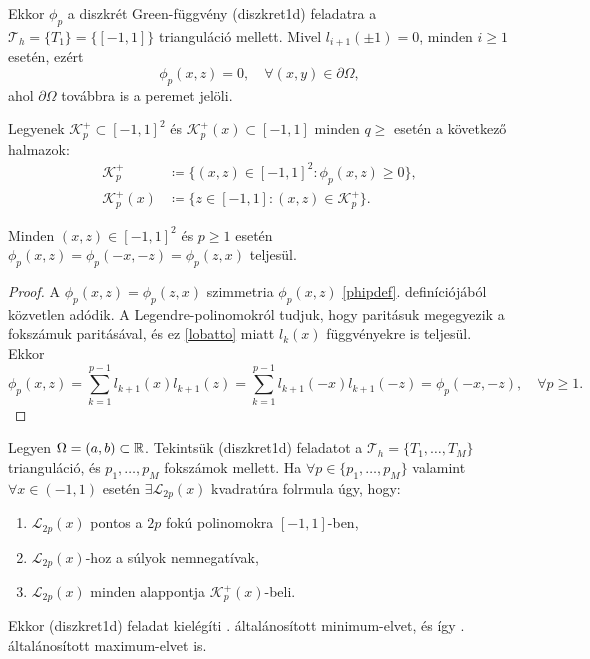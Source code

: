 Ekkor $\phi_p$ a diszkrét Green-függvény \aref({diszkret1d}) feladatra a $\mathcal{T}_h = \{T_1\} = \{[-1,1]\}$ trianguláció mellett. Mivel $l_{i+1}(\pm 1) = 0$, minden $i \geq 1$ esetén, ezért 
	\begin{equation}
		\phi_p(x,z) = 0, \quad \forall (x,y) \in \partial \Omega,
	\end{equation}
	ahol $\partial \Omega$ továbbra is a peremet jelöli.
	
\begin{definition}
	Legyenek $\mathcal{K}_p^+ \subset [-1,1]^2$ és $\mathcal{K}_p^+(x) \subset [-1,1]$ minden $q \geq$ esetén a következő halmazok:
	\begin{align*}
		\mathcal{K}_p^+ &\coloneqq  \{ (x,z) \in [-1,1]^2 : \phi_p(x,z) \geq 0 \}, \\
		\mathcal{K}_p^+(x) &\coloneqq  \{ z \in [-1,1] : (x,z) \in  \mathcal{K}_p^+ \}.	
	\end{align*}	
\end{definition}

\begin{lemma}\label{szimmlemma}
	Minden $(x,z) \in [-1,1]^2$ és $p\geq 1$ esetén $\phi_p(x,z) = \phi_p(-x,-z) = \phi_p(z,x)$ teljesül.
\end{lemma}

\begin{proof}
	A $\phi_p(x,z) = \phi_p(z,x)$ szimmetria $\phi_p(x,z)$ \eqref{phipdef}. definíciójából  közvetlen adódik. A Legendre-polinomokról tudjuk, hogy paritásuk megegyezik a fokszámuk paritásával, és ez \eqref{lobatto} miatt $l_k(x)$ függvényekre is teljesül. Ekkor	
	\begin{equation*}
		\phi_p(x,z) = \sum_{k=1}^{p-1} l_{k+1}(x)l_{k+1}(z) = \sum_{k=1}^{p-1} l_{k+1}(-x)l_{k+1}(-z) = \phi_p(-x,-z), \quad \forall p \geq 1.
	\end{equation*}	
\end{proof}

\begin{theorem}\label{fottetel}
	Legyen $\Omega = (a,b) \subset \mathbb{R}$. Tekintsük \aref({diszkret1d}) feladatot a $\mathcal{T}_h = \{ T_1, \ldots, T_M\}$ trianguláció, és $p_1, \ldots, p_M$ fokszámok mellett. Ha $\forall p \in \{p_1, \ldots, p_M \}$  valamint $\forall x \in (-1,1)$ esetén $\exists \mathcal{L}_{2p}(x)$ kvadratúra folrmula úgy, hogy:
	\begin{enumerate}[label=(\roman*)]
		\item 	$\mathcal{L}_{2p}(x)$ pontos a $2p$ fokú polinomokra $[-1,1]$-ben, \label{lpontos}
		\item	$\mathcal{L}_{2p}(x)$-hoz a súlyok nemnegatívak,
		\item	$\mathcal{L}_{2p}(x)$ minden alappontja $\mathcal{K}_p^+(x)$-beli. \label{lutolsó}
	\end{enumerate}
	Ekkor \aref({diszkret1d}) feladat kielégíti . általánosított minimum-elvet, és így . általánosított maximum-elvet is.
\end{theorem}


